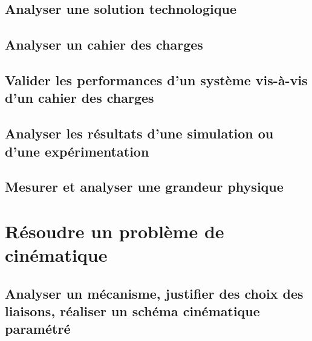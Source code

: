 \section{Analyser une solution technologique} 
\section{Analyser un cahier des charges} 
\section{Valider les performances d'un système vis-à-vis d'un cahier des charges} 
\section{Analyser les résultats d'une simulation ou d'une expérimentation} 
\section{Mesurer et analyser une grandeur physique} 
\setchapterpreamble[u]{\margintoc} 
\chapter{Résoudre un problème de cinématique} 
\section{Analyser un mécanisme, justifier des choix des liaisons, réaliser un schéma cinématique paramétré} 
\graphicspath{{\repStyle/png/}{../CIN/CIN-01-ModeliserSchemasCinematiques/01_T/images/}} 
 
 
\graphicspath{{\repStyle/png/}{../CIN/CIN-01-ModeliserSchemasCinematiques/02_R/images/}} 
 
 
\graphicspath{{\repStyle/png/}{../CIN/CIN-01-ModeliserSchemasCinematiques/03_TT/images/}} 
 
 
\graphicspath{{\repStyle/png/}{../CIN/CIN-01-ModeliserSchemasCinematiques/04_RR/images/}} 
 
 
\graphicspath{{\repStyle/png/}{../CIN/CIN-01-ModeliserSchemasCinematiques/05_RT/images/}} 
 
 
